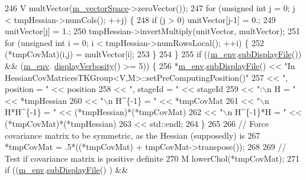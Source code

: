 \begin{DoxyCode}
246     V multVector(\hyperlink{class_q_u_e_s_o_1_1_base_t_k_group_a9930bbda0f3d9368653fb0577b89ec33}{m\_vectorSpace}->zeroVector());
247     \textcolor{keywordflow}{for} (\textcolor{keywordtype}{unsigned} \textcolor{keywordtype}{int} j = 0; j < tmpHessian->numCols(); ++j) \{
248       \textcolor{keywordflow}{if} (j > 0) unitVector[j-1] = 0.;
249       unitVector[j] = 1.;
250       tmpHessian->invertMultiply(unitVector, multVector);
251       \textcolor{keywordflow}{for} (\textcolor{keywordtype}{unsigned} \textcolor{keywordtype}{int} i = 0; i < tmpHessian->numRowsLocal(); ++i) \{
252         (*tmpCovMat)(i,j) = multVector[i];
253       \}
254     \}
255     \textcolor{keywordflow}{if} ((\hyperlink{class_q_u_e_s_o_1_1_base_t_k_group_a2bce5e8aa5c844d4332a0e73cf00a1f9}{m\_env}.\hyperlink{class_q_u_e_s_o_1_1_base_environment_a8a0064746ae8dddfece4229b9ad374d6}{subDisplayFile}()) && (\hyperlink{class_q_u_e_s_o_1_1_base_t_k_group_a2bce5e8aa5c844d4332a0e73cf00a1f9}{m\_env}.
      \hyperlink{class_q_u_e_s_o_1_1_base_environment_a1fe5f244fc0316a0ab3e37463f108b96}{displayVerbosity}() >= 5)) \{
256       *\hyperlink{class_q_u_e_s_o_1_1_base_t_k_group_a2bce5e8aa5c844d4332a0e73cf00a1f9}{m\_env}.\hyperlink{class_q_u_e_s_o_1_1_base_environment_a8a0064746ae8dddfece4229b9ad374d6}{subDisplayFile}() << \textcolor{stringliteral}{"In
       HessianCovMatricesTKGroup<V,M>::setPreComputingPosition()"}
257                              << \textcolor{stringliteral}{", position = "}  << position
258                              << \textcolor{stringliteral}{", stageId = "}   << stageId
259                              << \textcolor{stringliteral}{":\(\backslash\)n H = "}       << *tmpHessian
260                              << \textcolor{stringliteral}{"\(\backslash\)n H^\{-1\} = "}   << *tmpCovMat
261                              << \textcolor{stringliteral}{"\(\backslash\)n H*H^\{-1\} = "} << (*tmpHessian)*(*tmpCovMat)
262                              << \textcolor{stringliteral}{"\(\backslash\)n H^\{-1\}*H = "} << (*tmpCovMat)*(*tmpHessian)
263                              << std::endl;
264     \}
265 
266     \textcolor{comment}{// Force covariance matrix to be symmetric, as the Hessian (supposedly) is}
267     *tmpCovMat = .5*((*tmpCovMat) + tmpCovMat->transpose());
268 
269     \textcolor{comment}{// Test if covariance matrix is positive definite}
270     M lowerChol(*tmpCovMat);
271     \textcolor{keywordflow}{if} ((\hyperlink{class_q_u_e_s_o_1_1_base_t_k_group_a2bce5e8aa5c844d4332a0e73cf00a1f9}{m\_env}.\hyperlink{class_q_u_e_s_o_1_1_base_environment_a8a0064746ae8dddfece4229b9ad374d6}{subDisplayFile}()        ) &&

\end{DoxyCode}
